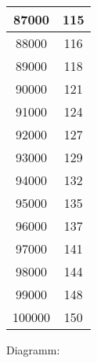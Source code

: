 \documentclass[ngerman,a4paper]{report}
\begin{document}
\begin{tabular}{|c|c|}
\hline
87000 & 115\\
\hline
88000 & 116\\
\hline
89000 & 118\\
\hline
90000 & 121\\
\hline
91000 & 124\\
\hline
92000 & 127\\
\hline
93000 & 129\\
\hline
94000 & 132\\
\hline
95000 & 135\\
\hline
96000 & 137\\
\hline
97000 & 141\\
\hline
98000 & 144\\
\hline
99000 & 148\\
\hline
100000 & 150\\
\hline
\end{tabular}

Diagramm:
\end{document}
